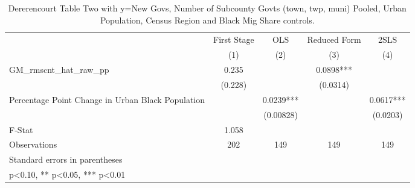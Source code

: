 \begin{table}[htbp]\centering
\def\sym#1{\ifmmode^{#1}\else\(^{#1}\)\fi}
\caption{Dererencourt Table Two with y=New Govs, Number of Subcounty Govts (town, twp, muni) Pooled, Urban Population, Census Region and Black Mig Share controls.}
\begin{tabular}{l*{4}{c}}
\toprule
                    & First Stage   &         OLS   &Reduced Form   &        2SLS   \\
                    &\multicolumn{1}{c}{(1)}   &\multicolumn{1}{c}{(2)}   &\multicolumn{1}{c}{(3)}   &\multicolumn{1}{c}{(4)}   \\
\midrule
GM\_rmscnt\_hat\_raw\_pp&       0.235   &               &      0.0898***&               \\
                    &     (0.228)   &               &    (0.0314)   &               \\
\addlinespace
Percentage Point Change in Urban Black Population&               &      0.0239***&               &      0.0617***\\
                    &               &   (0.00828)   &               &    (0.0203)   \\
\midrule
F-Stat              &       1.058   &               &               &               \\
Observations        &         202   &         149   &         149   &         149   \\
\bottomrule
\multicolumn{5}{l}{\footnotesize Standard errors in parentheses}\\
\multicolumn{5}{l}{\footnotesize * p<0.10, ** p<0.05, *** p<0.01}\\
\end{tabular}
\end{table}

